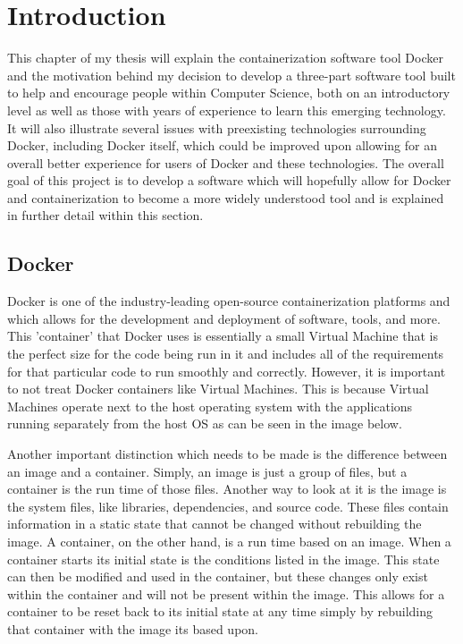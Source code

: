 \chapter{Introduction}
\label{ch:intro}

This chapter of my thesis will explain the containerization software tool Docker and the motivation behind my decision to develop a three-part software tool built to help and encourage people within Computer Science, both on an introductory level as well as those with years of experience to learn this emerging technology. It will also illustrate several issues with preexisting technologies surrounding Docker, including Docker itself, which could be improved upon allowing for an overall better experience for users of Docker and these technologies. The overall goal of this project is to develop a software which will hopefully allow for Docker and containerization to become a more widely understood tool and is explained in further detail within this section.

\break


\section{Docker}
\label{sec:docker}

Docker \cite{dockerDocs} is one of the industry-leading open-source containerization platforms and which allows for the development and deployment of software, tools, and more. This 'container' that Docker uses is essentially a small Virtual Machine that is the perfect size for the code being run in it and includes all of the requirements for that particular code to run smoothly and correctly. However, it is important to not treat Docker containers like Virtual Machines. This is because Virtual Machines operate next to the host operating system with the applications running separately from the host OS as can be seen in the image below.

Another important distinction which needs to be made is the difference between an image and a container. Simply, an image is just a group of files, but a container is the run time of those files. Another way to look at it is the image is the system files, like libraries, dependencies, and source code. These files contain information in a static state that cannot be changed without rebuilding the image. A container, on the other hand, is a run time based on an image. When a container starts its initial state is the conditions listed in the image. This state can then be modified and used in the container, but these changes only exist within the container and will not be present within the image. This allows for a container to be reset back to its initial state at any time simply by rebuilding that container with the image its based upon.


